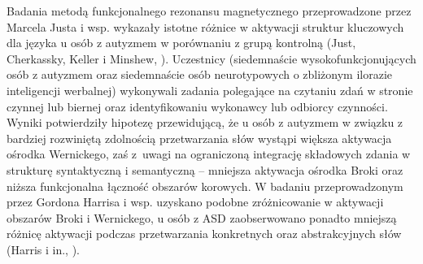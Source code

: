     

    
    Badania metodą funkcjonalnego rezonansu magnetycznego przeprowadzone przez Marcela Justa i wsp. wykazały istotne różnice w aktywacji struktur kluczowych dla języka u osób z autyzmem w porównaniu z grupą kontrolną (Just, Cherkassky, Keller i Minshew, \cite*{just2004cortical}).
    Uczestnicy (siedemnaście wysokofunkcjonujących osób z autyzmem oraz siedemnaście osób neurotypowych o zbliżonym ilorazie inteligencji werbalnej) wykonywali zadania polegające na czytaniu zdań w stronie czynnej lub biernej oraz identyfikowaniu wykonawcy lub odbiorcy czynności.
    Wyniki potwierdziły hipotezę przewidującą, że u osób z autyzmem w związku z bardziej rozwiniętą zdolnością przetwarzania słów wystąpi większa aktywacja ośrodka Wernickego, zaś z~uwagi na ograniczoną integrację składowych zdania w strukturę syntaktyczną i semantyczną -- mniejsza aktywacja ośrodka Broki oraz niższa funkcjonalna łączność obszarów korowych.
    W badaniu przeprowadzonym przez Gordona Harrisa i wsp. uzyskano podobne zróżnicowanie w aktywacji obszarów Broki i Wernickego, u osób z ASD zaobserwowano ponadto mniejszą różnicę aktywacji podczas przetwarzania konkretnych oraz abstrakcyjnych słów (Harris i in., \cite*{harris2006brain}).
    
